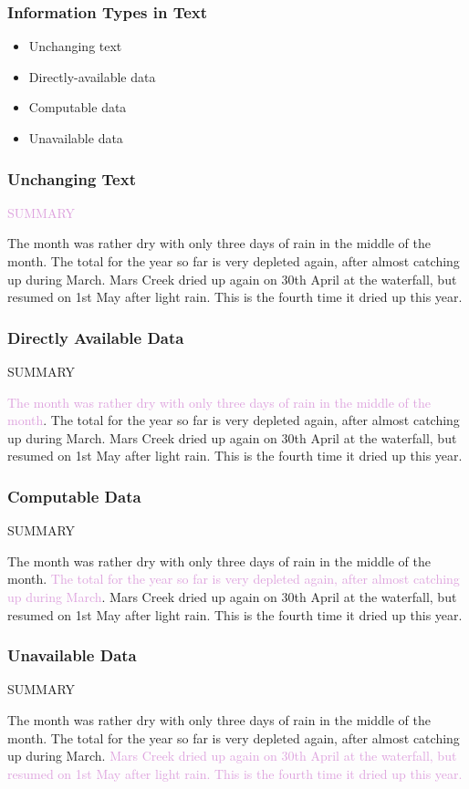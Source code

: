 \documentclass[compress,color=usenames]{beamer}
\newcommand{\mH}[1]{\textcolor{Plum}{#1}}
\begin{document}
\begin{frame}
\frametitle{Information Types in Text}

\label{f88}
\begin{itemize}
\item { {Unchanging text}}
\item { {Directly-available data}}
\item { {Computable data}}
\item { {Unavailable data}}
\end{itemize}

\end{frame}

\begin{frame}
\frametitle{Unchanging Text}

\mH{SUMMARY}

{ {The month was rather dry with only three days of rain in the middle of the month. The total for the year so far is very depleted again, after almost catching up during March. Mars Creek dried up again on 30th April at the waterfall, but resumed on 1st May after light rain. This is the fourth time it dried up this year.}}

\end{frame}

\begin{frame}
\frametitle{Directly Available Data}

SUMMARY

\mH{The month was rather dry with only three days of rain in the middle of the month}. The total for the year so far is very depleted again, after almost catching up during March. Mars Creek dried up again on 30th April at the waterfall, but resumed on 1st May after light rain. This is the fourth time it dried up this year.

\end{frame}

\begin{frame}
\frametitle{Computable Data}

SUMMARY

The month was rather dry with only three days of rain in the middle of the month. \mH{The total for the year so far is very depleted again, after almost catching up during March}. Mars Creek dried up again on 30th April at the waterfall, but resumed on 1st May after light rain. This is the fourth time it dried up this year.

\end{frame}

\begin{frame}
\frametitle{Unavailable Data}

SUMMARY

The month was rather dry with only three days of rain in the middle of the month. The total for the year so far is very depleted again, after almost catching up during March. \mH{Mars Creek dried up again on 30th April at the waterfall, but resumed on 1st May after light rain. This is the fourth time it dried up this year.}

\end{frame}
\end{document}
